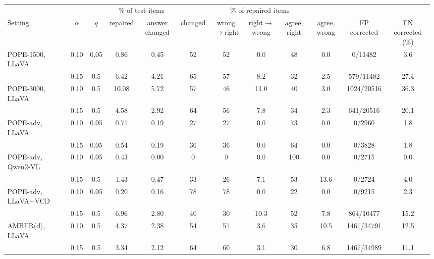 \begin{tabular}{lccccccccccc}
\toprule
 & & & \multicolumn{2}{c}{\% of test items} & \multicolumn{5}{c}{\% of repaired items} & & \\
\cmidrule(lr){4-5}\cmidrule(lr){6-10}
Setting & $\alpha$ & $q$ & repaired & answer changed & changed & wrong$\to$right & right$\to$wrong & agree, right & agree, wrong & FP corrected & FN corrected (\%)\\
\midrule
POPE-1500, LLaVA & 0.10 & 0.05 & 0.86 & 0.45 & 52 & 52 & 0.0 & 48 & 0.0 & 0/11482 & 3.6\\
 & 0.15 & 0.5 & 6.42 & 4.21 & 65 & 57 & 8.2 & 32 & 2.5 & 579/11482 & 27.4\\
\addlinespace
POPE-3000, LLaVA & 0.10 & 0.5 & 10.08 & 5.72 & 57 & 46 & 11.0 & 40 & 3.0 & 1024/20516 & 36.3\\
 & 0.15 & 0.5 & 4.58 & 2.92 & 64 & 56 & 7.8 & 34 & 2.3 & 641/20516 & 20.1\\
\addlinespace
POPE-adv, LLaVA & 0.10 & 0.05 & 0.71 & 0.19 & 27 & 27 & 0.0 & 73 & 0.0 & 0/2960 & 1.8\\
 & 0.15 & 0.05 & 0.54 & 0.19 & 36 & 36 & 0.0 & 64 & 0.0 & 0/3828 & 1.8\\
\addlinespace
POPE-adv, Qwen2-VL & 0.10 & 0.05 & 0.43 & 0.00 & 0 & 0 & 0.0 & 100 & 0.0 & 0/2715 & 0.0\\
 & 0.15 & 0.5 & 1.43 & 0.47 & 33 & 26 & 7.1 & 53 & 13.6 & 0/2724 & 4.0\\
\addlinespace
POPE-adv, LLaVA+VCD & 0.10 & 0.05 & 0.20 & 0.16 & 78 & 78 & 0.0 & 22 & 0.0 & 0/9215 & 2.3\\
 & 0.15 & 0.5 & 6.96 & 2.80 & 40 & 30 & 10.3 & 52 & 7.8 & 864/10477 & 15.2\\
\addlinespace
AMBER(d), LLaVA & 0.10 & 0.5 & 4.37 & 2.38 & 54 & 51 & 3.6 & 35 & 10.5 & 1461/34791 & 12.5\\
 & 0.15 & 0.5 & 3.34 & 2.12 & 64 & 60 & 3.1 & 30 & 6.8 & 1467/34989 & 11.1\\
\bottomrule
\end{tabular}
